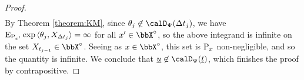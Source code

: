 \begin{proof}
\begin{align*}
  \end{align*}
  By Theorem \ref{theorem:KM}, since $\twistVar_j \not\in \momentSpace(\Delta t_j)$, we have ${\operatorname{E}}_{{\operatorname{P}}_{x'}} \exp{\langle \theta_j , X_{\Delta t_j} \rangle} = \infty$ for all $\stateVar' \in \stateSpace^\circ$, so the above integrand is infinite on the set $\X_{t_{j-1}} \in \stateSpace^\circ$.
  Seeing as $\stateVar \in \stateSpace^\circ$, this set is ${\operatorname{P}}_x$ non-negligible, and so the quantity is infinite.
  We conclude that $\underline\momentVar \not\in \momentSpace(\underline t)$, which finishes the proof by contrapositive.
\end{proof}
